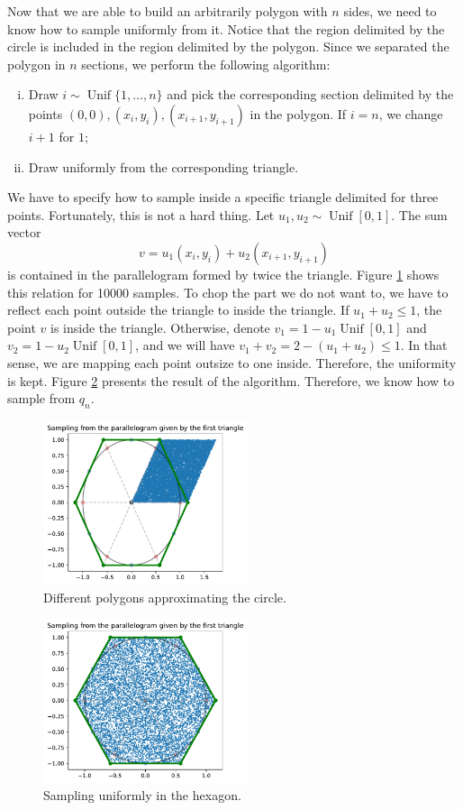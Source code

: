 \documentclass[a4paper,10pt, notitlepage]{report}
\begin{document}
Now that we are able to build an arbitrarily polygon with $n$ sides, we need
to know how to sample uniformly from it. Notice that the region delimited
by the circle is included in the region delimited by the polygon. 
Since we separated the polygon in $n$ sections, we perform the following algorithm:

\begin{enumerate}[(i)]
    \item Draw $i \sim \operatorname{Unif}\{1, \dots, n\}$ and pick the
    corresponding section delimited by the points $(0,0), (x_i, y_i),
    (x_{i+1}, y_{i+1})$ in the polygon. If $i=n$, we change $i+1$ for $1$;
    \item Draw uniformly from the corresponding triangle.
\end{enumerate}

We have to specify how to sample inside a specific triangle delimited for
three points. Fortunately, this is not a hard thing. Let $u_1, u_2 \sim
\operatorname{Unif}[0,1]$. The sum vector
$$
v= u_1(x_i, y_i) + u_2(x_{i+1}, y_{i+1})
$$
is contained in the parallelogram formed by twice the triangle. Figure
\ref{fig:figure5} shows this relation for 10000 samples. To chop the part we
do not want to, we have to reflect each point outside the triangle to inside
the triangle. If $u_1 + u_2 \le 1$, the point $v$ is inside the triangle.
Otherwise, denote $v_1 = 1 - u_1 \operatorname{Unif}[0,1]$ and $v_2 = 1 - u_2
\operatorname{Unif}[0,1]$, and we will have $v_1 + v_2 = 2 - (u_1 + u_2) \le
1$. In that sense, we are mapping each point outsize to one inside. Therefore,
the uniformity is kept. Figure \ref{fig:figure6} presents the result of the
algorithm. Therefore, we know how to sample from $q_n$. 

\begin{figure}[htb]
    \centering
    \includegraphics[width=6cm]{images/figure5.pdf}
    \caption{\label{fig:figure5}Different polygons approximating the circle.}
\end{figure}

\begin{figure}[htb]
    \centering
    \includegraphics[width=6cm]{images/figure6.pdf}
    \caption{\label{fig:figure6}Sampling uniformly in the hexagon.}
\end{figure}
\end{document}
